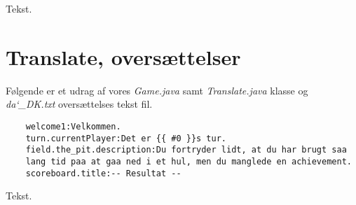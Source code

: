 \noindent Tekst.\\

\section{Translate, oversættelser}
\noindent Følgende er et udrag af vores \textit{Game.java} samt \textit{Translate.java} klasse og \textit{da\char`_DK.txt} oversættelses tekst fil.\\
\begin{lstlisting}
    welcome1:Velkommen.
    turn.currentPlayer:Det er {{ #0 }}s tur.
    field.the_pit.description:Du fortryder lidt, at du har brugt saa
    lang tid paa at gaa ned i et hul, men du manglede en achievement.    
    scoreboard.title:-- Resultat --    
\end{lstlisting}
\vspace{2ex}

\noindent Tekst.\\
